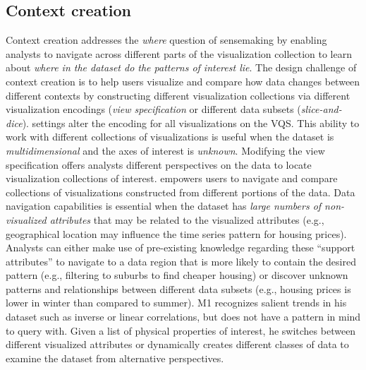 {  \subsection{Context creation}
  Context creation addresses the \textit{where} question of sensemaking by enabling analysts to navigate across different parts of the visualization collection to learn about \textit{where in the dataset do the patterns of interest lie}. The design challenge of context creation is to help users visualize and compare how data changes between different contexts by constructing different visualization collections via different visualization encodings (\textit{view specification} or different data subsets (\textit{slice-and-dice}).%
   settings alter the encoding for all visualizations on the VQS. This ability to work with different collections of visualizations is useful when the dataset is \emph{multidimensional} and the axes of interest is \emph{unknown}. Modifying the view specification offers analysts different perspectives on the data to locate visualization collections of interest.
   empowers users to navigate and compare collections of visualizations constructed from different portions of the data. Data navigation capabilities is essential when the dataset has \emph{large numbers of non-visualized attributes} that may be related to the visualized attributes (e.g., geographical location may influence the time series pattern for housing prices). Analysts can either make use of pre-existing knowledge regarding these ``support attributes'' to navigate to a data region that is more likely to contain the desired pattern (e.g., filtering to suburbs to find cheaper housing) or discover unknown patterns and relationships between different data subsets (e.g., housing prices is lower in winter than compared to summer).%
   M1 recognizes salient trends in his dataset such as inverse or linear correlations, but does not have a pattern in mind to query with. Given a list of physical properties of interest, he switches between different visualized attributes or dynamically creates different classes of data to examine the dataset from alternative perspectives.
}
